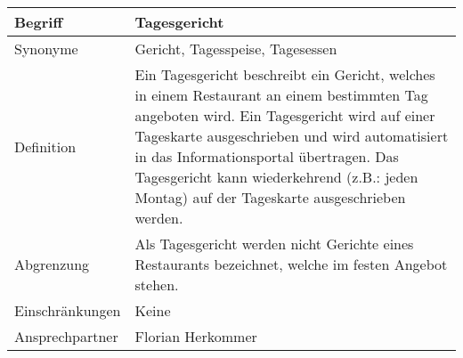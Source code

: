 \begin{table}[H]
    \centering
    \label{gls:tagesgericht}
    \begin{tabularx}{\textwidth}{| l | X |}
        \hline
        Begriff         & Tagesgericht                                                                                                                                                                                                                                                                                                                           \\
        \hline
        Synonyme        & Gericht, Tagesspeise, Tagesessen                                                                                                                                                                                                                                                                                                       \\
        \hline
        Definition      & Ein Tagesgericht beschreibt ein Gericht, welches in einem Restaurant an einem bestimmten Tag angeboten wird. Ein Tagesgericht wird auf einer Tageskarte ausgeschrieben und wird automatisiert in das Informationsportal übertragen. Das Tagesgericht kann wiederkehrend (z.B.: jeden Montag) auf der Tageskarte ausgeschrieben werden. \\
        \hline
        Abgrenzung      & Als Tagesgericht werden nicht Gerichte eines Restaurants bezeichnet, welche im festen Angebot stehen.                                                                                                                                                                                                                                  \\
        \hline
        Einschränkungen & Keine                                                                                                                                                                                                                                                                                                                                  \\
        \hline
        Ansprechpartner & Florian Herkommer                                                                                                                                                                                                                                                                                                                      \\

\end{tabularx}
\end{table}
